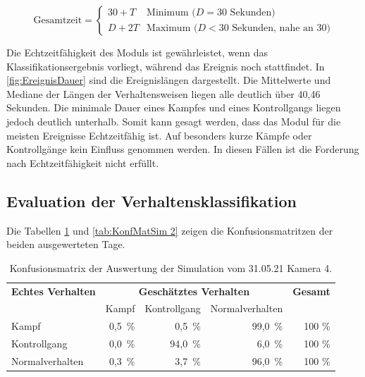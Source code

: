 \begin{equation}
    \label{eq:deltTErkenn}
    \text{Gesamtzeit} = 
    \begin{cases} 
    30 + T & \text{Minimum (} D = 30 \text{ Sekunden)} \\
    D + 2T & \text{Maximum (} D < 30 \text{ Sekunden, nahe an 30)}
    \end{cases}
\end{equation}

 Die Echtzeitfähigkeit des Moduls ist gewährleistet, wenn das Klassifikationsergebnis vorliegt, während das Ereignis noch stattfindet. In \autoref{fig:EreignisDauer} sind die Ereignislängen dargestellt. Die Mittelwerte und Mediane der Längen der Verhaltensweisen liegen alle deutlich über 40,46 Sekunden. Die minimale Dauer eines Kampfes und eines Kontrollgangs liegen jedoch deutlich unterhalb. Somit kann gesagt werden, dass das Modul für die meisten Ereignisse Echtzeitfähig ist. Auf besonders kurze Kämpfe oder Kontrollgänge kein Einfluss genommen werden. In diesen Fällen ist die Forderung nach Echtzeitfähigkeit nicht erfüllt.


\subsection{Evaluation der Verhaltensklassifikation}
Die Tabellen \ref{tab:KonfMatSim 1} und \ref{tab:KonfMatSim 2} zeigen die Konfusionsmatritzen der beiden ausgewerteten Tage. 

\begin{table}[htbp]
    \centering
    \caption{Konfusionsmatrix der Auswertung der Simulation vom 31.05.21 Kamera 4.}
    \label{tab:KonfMatSim 1}
    \begin{tabular}{l|rrr|r}
        \toprule
        \multirow{1}{*}{\textbf{Echtes Verhalten}} & \multicolumn{3}{c|}{\textbf{Geschätztes Verhalten}} & {\textbf{Gesamt}}\\
         & Kampf & Kontrollgang & Normalverhalten & \\
        \midrule
        Kampf                & 0,5\, \% &  0,5\, \% & 99,0\, \% & 100 \%\\
        Kontrollgang         & 0,0\, \% & 94,0\, \% &  6,0\, \% & 100 \%\\
        Normalverhalten      & 0,3\, \% &  3,7\, \% & 96,0\, \% & 100 \%\\
        \bottomrule
    \end{tabular}
\end{table}

